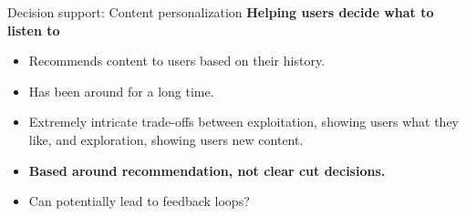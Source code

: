 \documentclass[8pt]{beamer}
\begin{document}
	\begin{frame}[t]{Decision support: Content personalization}
		\textbf{Helping users decide what to listen to}
		\vspace{0.3cm}
		\begin{center}
		\end{center}
		\vspace{0.3cm}
		\begin{itemize}
			\item Recommends content to users based on their history.
			\item Has been around for a long time.
			\item Extremely intricate trade-offs between exploitation, showing users what they like, and exploration, showing users new content.
			\item \textbf{Based around recommendation, not clear cut decisions.}
			\item Can potentially lead to feedback loops?
		\end{itemize}
	\end{frame}
\end{document}
